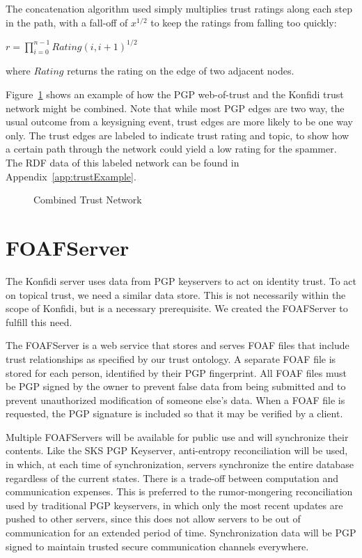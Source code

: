 \documentclass[letterpaper]{www2006-submission}
\begin{document}
The concatenation algorithm used simply multiplies trust ratings along each step in the path, with a fall-off of $x^{1/2}$ to keep the ratings from falling too quickly:

\begin{center}
$r = \prod_{i=0}^{n-1} Rating(i, i + 1)^{1/2}$
\end{center}

where $Rating$ returns the rating on the edge of two adjacent nodes.

Figure~\ref{fig:full} shows an example of how the PGP web-of-trust and the Konfidi trust network might be combined.  Note that while most PGP edges are two way, the usual outcome from a keysigning event, trust edges are more likely to be one way only.  The trust edges are labeled to indicate trust rating and topic, to show how a certain path through the network could yield a low rating for the spammer.  The RDF data of this labeled network can be found in Appendix~\ref{app:trustExample}.

\begin{figure}[thp]
\centering
{}
\caption{Combined Trust Network}
\label{fig:full}
\end{figure}

\section{FOAFServer}
\label{foafserver}
The Konfidi server uses data from PGP keyservers to act on identity trust.  To act on topical trust, we need a similar data store.  This is not necessarily within the scope of Konfidi, but is a necessary prerequisite.  We created the FOAFServer to fulfill this need.

The FOAFServer is a web service that stores and serves FOAF files that include trust relationships as specified by our trust ontology.  A separate FOAF file is stored for each person, identified by their PGP fingerprint.  All FOAF files must be PGP signed by the owner to prevent false data from being submitted and to prevent unauthorized modification of someone else's data.  When a FOAF file is requested, the PGP signature is included so that it may be verified by a client.

Multiple FOAFServers will be available for public use and will synchronize their contents.  Like the SKS PGP Keyserver\citep{sks}, anti-entropy reconciliation will be used, in which, at each time of synchronization, servers synchronize the entire database regardless of the current states.  There is a trade-off between computation and communication expenses.  This is preferred to the rumor-mongering reconciliation  used by traditional PGP keyservers, in which only the most recent updates are pushed to other servers, since this does not allow servers to be out of communication for an extended period of time.  Synchronization data will be PGP signed to maintain trusted secure communication channels everywhere.
\end{document}
